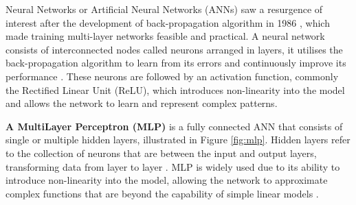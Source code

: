 Neural Networks or Artificial Neural Networks (ANNs) saw a resurgence of interest after the development of back-propagation algorithm in 1986 \cite{rumelhart-1986-ann}, which made training multi-layer networks feasible and practical. A neural network consists of interconnected nodes called neurons arranged in layers, it utilises the back-propagation algorithm to learn from its errors and continuously improve its performance \cite{aws-neural-network}. These neurons are followed by an activation function, commonly the Rectified Linear Unit (ReLU), which introduces non-linearity into the model and allows the network to learn and represent complex patterns.

\textbf{A MultiLayer Perceptron (MLP)} is a fully connected ANN that consists of single or multiple hidden layers, illustrated in Figure \ref{fig:mlp}. Hidden layers refer to the collection of neurons that are between the input and output layers, transforming data from layer to layer \cite{uzair-2020-hidden-layers}. MLP is widely used due to its ability to introduce non-linearity into the model, allowing the network to approximate complex functions that are beyond the capability of simple linear models \cite{popescue-2009-mlp}.






